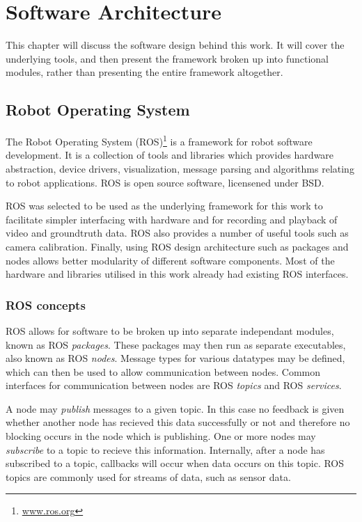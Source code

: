 \chapter{Software Architecture}
\label{chapter:architecture}

This chapter will discuss the software design behind this work.  It will cover the underlying tools, and then present the framework broken up into functional modules, rather than presenting the entire framework altogether.

\section{Robot Operating System}

The Robot Operating System (ROS)\footnote{\url{www.ros.org}} is a framework for robot software development.  It is a collection of tools and libraries which provides hardware abstraction, device drivers, visualization, message parsing and algorithms relating to robot applications.  ROS is open source software, licensened under BSD.

ROS was selected to be used as the underlying framework for this work to facilitate simpler interfacing with hardware and for recording and playback of video and groundtruth data.  ROS also provides a number of useful tools such as camera calibration.  Finally, using ROS design architecture such as packages and nodes allows better modularity of different software components.  Most of the hardware and libraries utilised in this work already had existing ROS interfaces.

\subsection{ROS concepts}

ROS allows for software to be broken up into separate independant modules, known as ROS \textit{packages}.  These packages may then run as separate executables, also known as ROS \textit{nodes}.  Message types for various datatypes may be defined, which can then be used to allow communication between nodes.  Common interfaces for communication between nodes are ROS \textit{topics} and ROS \textit{services}.

A node may \textit{publish} messages to a given topic.  In this case no feedback is given whether another node has recieved this data successfully or not and therefore no blocking occurs in the node which is publishing.  One or more nodes may \textit{subscribe} to a topic to recieve this information.  Internally, after a node has subscribed to a topic, callbacks will occur when data occurs on this topic.  ROS topics are commonly used for streams of data, such as sensor data.


